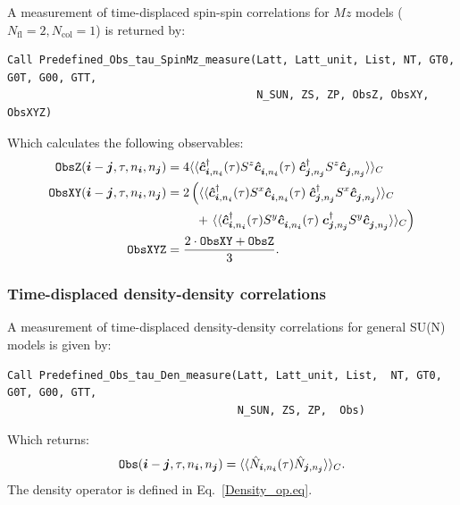 A measurement of time-displaced spin-spin correlations for $M\!z$ models ($N_\text{fl} = 2, N_\text{col} = 1$)  is returned by:
\begin{lstlisting}[style=fortran]
Call Predefined_Obs_tau_SpinMz_measure(Latt, Latt_unit, List, NT, GT0, G0T, G00, GTT,
                                       N_SUN, ZS, ZP, ObsZ, ObsXY, ObsXYZ)
\end{lstlisting}
Which calculates the following observables:
\begin{align}
\texttt{ObsZ}(\ve{i} - \ve{j}, \tau, n_{\ve{i}},  n_{\ve{j}} ) &= \begin{multlined}[t] 4 \langle \langle \ve{\hat{c}}^{\dagger}_{\ve{i}, n_{\ve{i}}}(\tau)  S^z \ve{\hat{c}}^{\phantom\dagger}_{\ve{i}, n_{\ve{i}} }(\tau)   \;  \ve{\hat{c}}^{\dagger}_{\ve{j}, n_{\ve{j}}} S^z  \ve{\hat{c}}^{\phantom\dagger}_{\ve{j}, n_{\ve{j}}}\rangle \rangle_{C} 
\end{multlined} \nonumber \\  
\texttt{ObsXY} (\ve{i} - \ve{j}, \tau, n_{\ve{i}},  n_{\ve{j}} ) &=\begin{multlined}[t] 
2 \left( \langle \langle \ve{\hat{c}}^{\dagger}_{\ve{i}, n_{\ve{i}}}(\tau) S^x \ve{\hat{c}}^{\phantom\dagger}_{\ve{i}, n_{\ve{i}} } (\tau)  \;  \ve{\hat{c}}^{\dagger}_{\ve{j}, n_{\ve{j}}} S^x  
\ve{\hat{c}}^{\phantom\dagger}_{\ve{j}, n_{\ve{j}}}\rangle \rangle_{C}  \right.\\
+ \left. \langle \langle \ve{\hat{c}}^{\dagger}_{\ve{i}, n_{\ve{i}}}(\tau) S^y \ve{\hat{c}}^{\phantom\dagger}_{\ve{i}, n_{\ve{i}} }(\tau)   \;  \ve{c}^{\dagger}_{\ve{j}, n_{\ve{j}}} S^y  \ve{\hat{c}}^{\phantom\dagger}_{\ve{j}, n_{\ve{j}}}\rangle \rangle_{C}  \right)  \end{multlined}  \nonumber \\
\texttt{ObsXYZ} &= \frac{2\cdot\texttt{ObsXY} + \texttt{ObsZ}}{3}.
\end{align}


\subsubsection{Time-displaced density-density correlations}

A measurement of time-displaced density-density correlations for general SU(N) models is given by:
\begin{lstlisting}[style=fortran]
Call Predefined_Obs_tau_Den_measure(Latt, Latt_unit, List,  NT, GT0, G0T, G00, GTT,
                                    N_SUN, ZS, ZP,  Obs)
\end{lstlisting}
Which returns:
\begin{align}
\texttt{Obs}(\boldsymbol{i} - \boldsymbol{j}, \tau, n_{\boldsymbol{i}},  n_{\boldsymbol{j}} ) = \langle  \langle \hat{ N}_{\boldsymbol{i},n_{\boldsymbol{i}}} (\tau)  \hat{N}_{\boldsymbol{j},n_{\boldsymbol{j}}}\rangle\rangle_C. 
 \end{align}
 The density operator is defined in Eq.~\eqref{Density_op.eq}.

